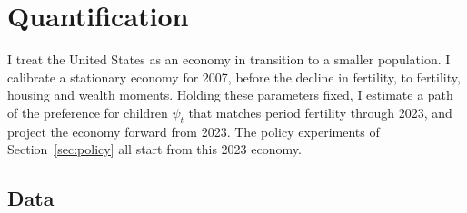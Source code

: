 
\section{Quantification}
\label{sec:quant}

I treat the United States as an economy in transition to a smaller
population. I calibrate a stationary economy for 2007, before the decline in
fertility, to fertility, housing and wealth moments. Holding these parameters
fixed, I estimate a path of the preference for children $\psi_t$ that matches
period fertility through 2023, and project the economy forward from 2023. The
policy experiments of Section~\ref{sec:policy} all start from this 2023
economy.

\subsection{Data}
\label{sec:quant-data}

